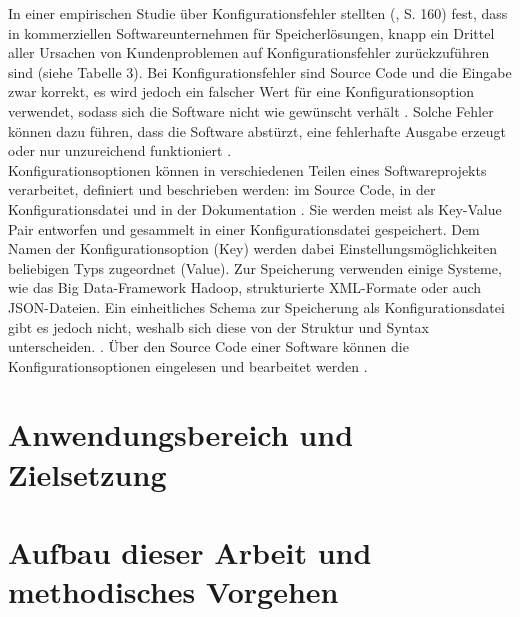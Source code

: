 \documentclass[german,bachelor]{swsLeipzig}
\begin{document}
In einer empirischen Studie über Konfigurationsfehler stellten \citeauthor{10.1145/2043556.2043572} (\citeyear{10.1145/2043556.2043572}, S. 160)  fest,
dass in kommerziellen Softwareunternehmen für Speicherlösungen, knapp ein Drittel aller Ursachen von Kundenproblemen auf Konfigurationsfehler zurückzuführen sind (siehe Tabelle 3).
Bei Konfigurationsfehler sind Source Code und die Eingabe zwar korrekt, es wird jedoch ein falscher Wert für eine Konfigurationsoption verwendet,
sodass sich die Software nicht wie gewünscht verhält \cite[S. 152]{10.1145/2568225.2568251}. Solche Fehler können dazu führen, dass die Software abstürzt,
eine fehlerhafte Ausgabe erzeugt oder nur unzureichend funktioniert \cite[S. 152]{10.1145/2568225.2568251}.\\

Konfigurationsoptionen können in verschiedenen Teilen eines Softwareprojekts verarbeitet, definiert und beschrieben werden:
im Source Code, in der Konfigurationsdatei und in der Dokumentation \cite[S. 185]{7774519}.
Sie werden meist als Key-Value Pair entworfen und gesammelt in einer Konfigurationsdatei gespeichert.
Dem Namen der Konfigurationsoption (Key) werden dabei Einstellungsmöglichkeiten beliebigen Typs zugeordnet (Value).
Zur Speicherung verwenden einige Systeme, wie das Big Data-Framework Hadoop, strukturierte XML-Formate oder auch JSON-Dateien.
Ein einheitliches Schema zur Speicherung als Konfigurationsdatei gibt es jedoch nicht, weshalb sich diese von der Struktur und Syntax unterscheiden. \cite[S. 131]{10.1145/1985793.1985812}.
Über den Source Code einer Software können die Konfigurationsoptionen eingelesen und bearbeitet werden \cite[S. 185]{7774519}.

\section{Anwendungsbereich und Zielsetzung}

\section{Aufbau dieser Arbeit und methodisches Vorgehen}
\end{document}
